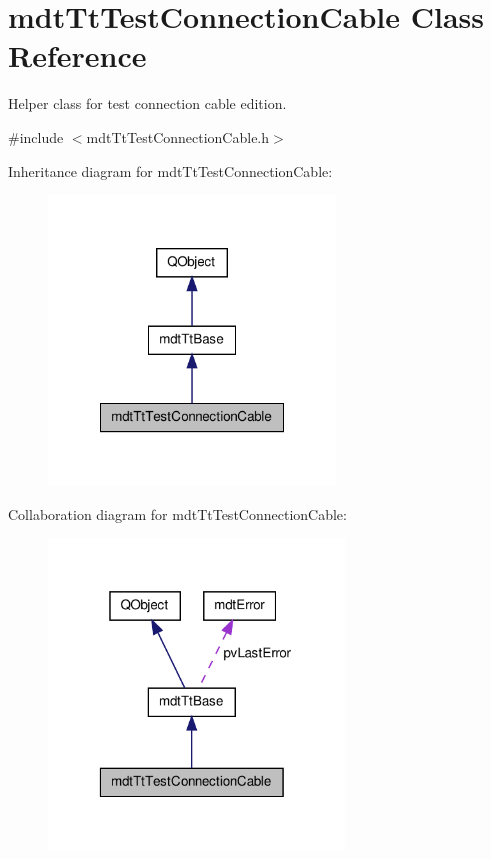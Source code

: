 \hypertarget{classmdt_tt_test_connection_cable}{\section{mdt\-Tt\-Test\-Connection\-Cable Class Reference}
\label{classmdt_tt_test_connection_cable}
}


Helper class for test connection cable edition.  




{\ttfamily \#include $<$mdt\-Tt\-Test\-Connection\-Cable.\-h$>$}



Inheritance diagram for mdt\-Tt\-Test\-Connection\-Cable\-:\nopagebreak
\begin{figure}[H]
\begin{center}
\leavevmode
\includegraphics[width=216pt]{classmdt_tt_test_connection_cable__inherit__graph}
\end{center}
\end{figure}


Collaboration diagram for mdt\-Tt\-Test\-Connection\-Cable\-:\nopagebreak
\begin{figure}[H]
\begin{center}
\leavevmode
\includegraphics[width=223pt]{classmdt_tt_test_connection_cable__coll__graph}
\end{center}
\end{figure}
